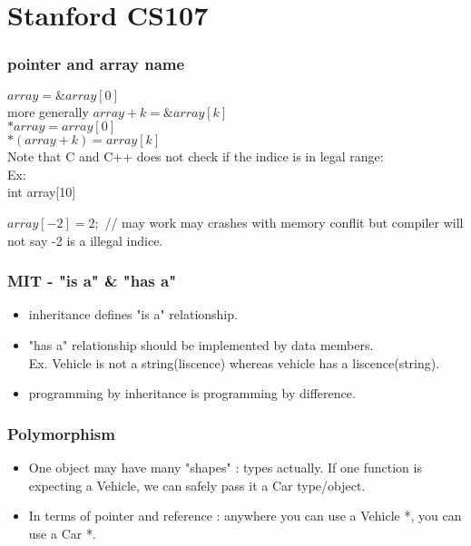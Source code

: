 \documentclass{beamer}
\begin{document}
\section{Stanford CS107}
\begin{frame}
\frametitle{pointer and array name}

$array = \&array[0]$ \\
more generally $array+k = \&array[k]$ \\
$ \ast array = array[0]$ \\
$ \ast (array+k) = array[k]$ \\

Note that C and C++ does not check if the indice is in legal range: \\
Ex:\\
int array[10]

$array[-2]=2;$ // may work may crashes with memory conflit but compiler will 
not say -2 is a illegal indice.  

\end{frame}
\begin{frame}
\frametitle{MIT - "is a" \& "has a"}
\begin{itemize}
	\item inheritance defines "is a" relationship.
	\item "has a" relationship should be implemented by data members.\\
	Ex. Vehicle is not a string(liscence) whereas vehicle has a liscence(string).
	\item programming by inheritance is programming by difference.
\end{itemize}
\end{frame}
\begin{frame}
\frametitle{Polymorphism}
\begin{itemize}
	\item One object may have many "shapes" : types actually. If one function is expecting a Vehicle, we can safely pass it a Car type/object. 
	\item In terms of pointer and reference : anywhere you can use a Vehicle *, you can use a Car *.
\end{itemize}
\end{frame}
\end{document}
